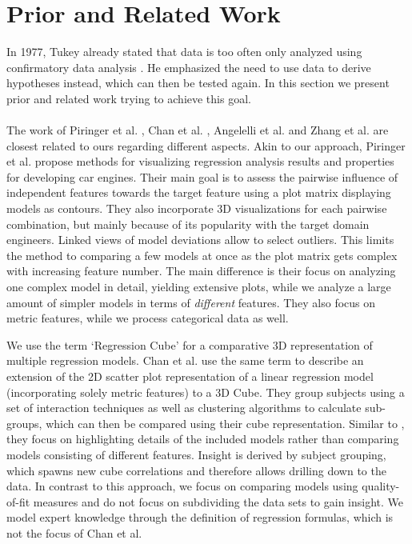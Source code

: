 \documentclass[journal]{style/vgtc} 			          %
\begin{document}
\section{Prior and Related Work}
In 1977, Tukey already stated that data is too often only analyzed using confirmatory data analysis \cite{Tukey}.
He emphasized the need to use data to derive hypotheses instead, which can then be tested again.
In this section we present prior and related work trying to achieve this goal.
\\\\
The work of Piringer et al. \cite{Piringer}, Chan et al. \cite{Chan}, Angelelli et al. \cite{Angelelli} and Zhang et al. \cite{Zhang2014} are closest related to ours regarding different aspects.
Akin to our approach, Piringer et al. \cite{Piringer} propose methods for visualizing regression analysis results and properties for developing car engines.
Their main goal is to assess the pairwise influence of independent features towards the target feature using a plot matrix displaying models as contours.
They also incorporate 3D visualizations for each pairwise combination, but mainly because of its popularity with the target domain engineers.
Linked views of model deviations allow to select outliers.
This limits the method to comparing a few models at once as the plot matrix gets complex with increasing feature number.
The main difference is their focus on analyzing one complex model in detail, yielding extensive plots, while we analyze a large amount of simpler models in terms of \emph{different} features.
They also focus on metric features, while we process categorical data as well.

We use the term `Regression Cube' for a comparative 3D representation of multiple regression models.
Chan et al. \cite{Chan} use the same term to describe an extension of the 2D scatter plot representation of a linear regression model (incorporating solely metric features) to a 3D Cube.
They group subjects using a set of interaction techniques as well as clustering algorithms to calculate sub-groups, which can then be compared using their cube representation.
Similar to \cite{Piringer}, they focus on highlighting details of the included models rather than comparing models consisting of different features.
Insight is derived by subject grouping, which spawns new cube correlations and therefore allows drilling down to the data.
In contrast to this approach, we focus on comparing models using quality-of-fit measures and do not focus on subdividing the data sets to gain insight.
We model expert knowledge through the definition of regression formulas, which is not the focus of Chan et al.
\end{document}
